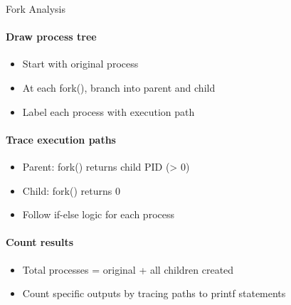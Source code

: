 \begin{KR}{Fork Analysis}
    \paragraph{Draw process tree}
    \begin{itemize}
        \item Start with original process
        \item At each fork(), branch into parent and child
        \item Label each process with execution path
    \end{itemize}
    
    \paragraph{Trace execution paths}
    \begin{itemize}
        \item Parent: fork() returns child PID (> 0)
        \item Child: fork() returns 0
        \item Follow if-else logic for each process
    \end{itemize}
    
    \paragraph{Count results}
    \begin{itemize}
        \item Total processes = original + all children created
        \item Count specific outputs by tracing paths to printf statements
    \end{itemize}
\end{KR}

